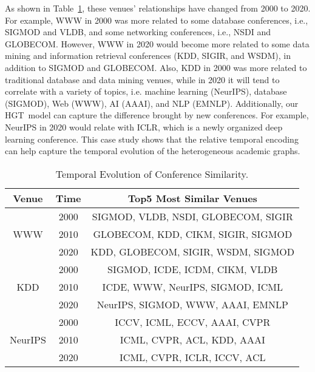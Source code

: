 \documentclass[sigconf]{acmart}
\theoremstyle{definition}
\newcommand{\short}{HGT}
\begin{document}
As shown in Table~\ref{tab:case}, these venues' relationships have changed from 2000 to 2020. 
For example, WWW in 2000 was more related to some database conferences, i.e., SIGMOD and VLDB, and some networking conferences, i.e., NSDI and GLOBECOM. 
However,  WWW in 2020 would become more related to some data mining and information retrieval conferences (KDD, SIGIR, and WSDM), in addition to SIGMOD and GLOBECOM. 
Also, KDD in 2000 was more related to traditional database and data mining venues, while in 2020 it will tend to correlate with a variety of topics, i.e. machine learning (NeurIPS), database (SIGMOD), Web (WWW), AI (AAAI), and NLP (EMNLP). 
Additionally, our \short\ model can capture the difference brought by new conferences. 
For example, NeurIPS in 2020 would relate with ICLR, which is a newly organized deep learning conference. 
This case study shows that the relative temporal encoding can help capture the temporal evolution of the heterogeneous academic graphs.

\begin{table}[t!]
\centering
\renewcommand\arraystretch{1.3}
\begin{tabular}{ccc} 
\toprule
Venue & Time & Top5 Most Similar Venues \\
\midrule
\multirow{3}{*}{WWW} & 2000 & SIGMOD, VLDB, NSDI, GLOBECOM, SIGIR\\
~& 2010 & GLOBECOM, KDD, CIKM, SIGIR, SIGMOD\\
~& 2020 & KDD, GLOBECOM, SIGIR, WSDM, SIGMOD\\
\midrule
\multirow{3}{*}{KDD} & 2000 & SIGMOD, ICDE, ICDM, CIKM, VLDB\\
~& 2010 & ICDE, WWW, NeurIPS, SIGMOD, ICML\\
~& 2020 & NeurIPS, SIGMOD, WWW, AAAI, EMNLP\\
\midrule
\multirow{3}{*}{NeurIPS} & 2000 & ICCV, ICML, ECCV, AAAI, CVPR\\
~& 2010 & ICML, CVPR, ACL, KDD, AAAI\\
~& 2020 & ICML, CVPR, ICLR, ICCV, ACL\\
\bottomrule
\end{tabular}
\caption{Temporal Evolution of Conference Similarity.} 
\label{tab:case} 
\end{table}
\end{document}
